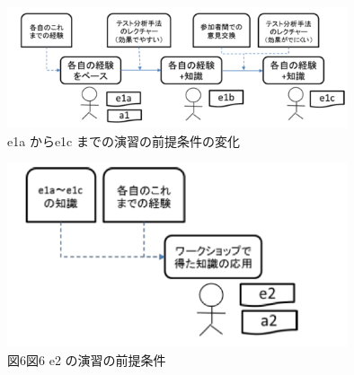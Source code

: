 \documentclass[a4paper,11pt]{jreport}
\begin{document}
   \begin{figure}[h]
  \begin{center}
  \includegraphics[width=10cm]{./image/D-3-Fig8.png}
  \caption{e1a からe1c までの演習の前提条件の変化}
  \label{fig:D-3-Fig8}
  \end{center}
   \end{figure}

   \begin{figure}[h]
  \begin{center}
  \includegraphics[width=10cm]{./image/D-3-Fig9.png}
  \caption{図6図6 e2 の演習の前提条件}
  \label{fig:D-3-Fig9}
  \end{center}
   \end{figure}
\end{document}
